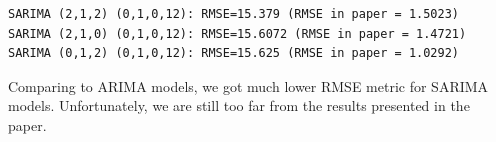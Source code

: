\documentclass[
  letterpaper,
  DIV=11,
  numbers=noendperiod]{scrartcl}
\begin{document}
\begin{verbatim}
SARIMA (2,1,2) (0,1,0,12): RMSE=15.379 (RMSE in paper = 1.5023)
SARIMA (2,1,0) (0,1,0,12): RMSE=15.6072 (RMSE in paper = 1.4721)
SARIMA (0,1,2) (0,1,0,12): RMSE=15.625 (RMSE in paper = 1.0292)
\end{verbatim}

Comparing to ARIMA models, we got much lower RMSE metric for SARIMA
models. Unfortunately, we are still too far from the results presented
in the paper.
\end{document}
